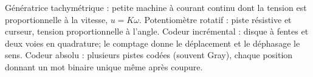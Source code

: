 \begin{corrigebox}
Génératrice tachymétrique : petite machine à courant continu dont la
        tension est proportionnelle à la vitesse, $u=K\omega$. Potentiomètre rotatif :
        piste résistive et curseur, tension proportionnelle à l'angle. Codeur incrémental :
        disque à fentes et deux voies en quadrature; le comptage donne le déplacement et
        le déphasage le sens. Codeur absolu : plusieurs pistes codées (souvent Gray), chaque
        position donnant un mot binaire unique même après coupure.
\end{corrigebox}
